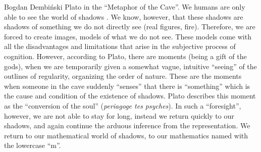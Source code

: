 \begin{artengenv}{Bogdan Dembiński}
Plato in the ``Metaphor of the Cave''. We humans are only able to see the world of shadows
\parencite[\textit{Republic}, 514-518d]{plato_platonis_1955}.
We know, however, that these shadows are shadows of
something we do not directly see (real figures, fire). Therefore, we are forced to create images, models of what we do
not see. These models come with all the disadvantages and limitations that arise in the subjective process of
cognition. However, according to Plato, there are moments (being a gift of the gods), when we are temporarily given a
somewhat vague, intuitive ``seeing'' of the outlines of regularity, organizing the order of nature.  These are the moments
when someone in the cave suddenly ``senses'' that there is ``something'' which is the cause and condition of the existence
of shadows. Plato describes this moment as the ``conversion of the soul'' (\textit{periagoge tes psyches}). In
such a ``foresight'', however, we are not able to stay for long, instead we return quickly to our shadows, and again
continue the arduous inference from the representation. We return to our mathematical world of shadows, to our
mathematics named with the lowercase ``m''. 


\end{artengenv}
